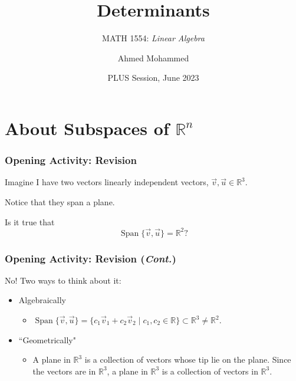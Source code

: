 \documentclass{beamer}
\title[Determinants]{Determinants}
\subtitle{MATH 1554: \textit{Linear Algebra}}
\author{Ahmed Mohammed}
\date{PLUS Session, June 2023}
\institute{Georgia Institute of Technology}
\DeclareMathOperator{\vspan}{Span}
\begin{document}
\frame{\titlepage}

\section{About Subspaces of \(\mathbb{R}^n\)}
\begin{frame}
	\frametitle{Opening Activity: Revision}
	Imagine I have two vectors linearly independent vectors, \(\vec{v}, \vec{u} \in \mathbb{R}^3\).\pause 

	Notice that they span a plane. \pause
	\begin{figure}[!h]
	\end{figure}\pause
	Is it true that \[\vspan\{\vec{v}, \vec{u}\} = \mathbb{R}^2?\]
\end{frame}

\begin{frame}
	\frametitle{Opening Activity: Revision (\textit{Cont.})}
	No!
	Two ways to think about it: \pause
		\begin{itemize}
			\item<1-> Algebraically
				\begin{itemize}
					\item<3-> \(\vspan \{\vec{v}, \vec{u}\} = \{c_1\vec{v}_1 + c_2\vec{v}_2 \mid c_1, c_2 \in \mathbb{R}\} \subset \mathbb{R}^3 \ne \mathbb{R}^2\).
				\end{itemize}
			\item<2-> ``Geometrically"
				\begin{itemize}
					\item<4-> A plane in \(\mathbb{R}^3\) is a collection of vectors whose tip lie on the plane. Since the vectors are in 
							\(\mathbb{R}^3\), a plane in \(\mathbb{R}^3\) is a collection of vectors in \(\mathbb{R}^3\).
				\end{itemize}
		\end{itemize} \pause


\end{frame}
\end{document}
